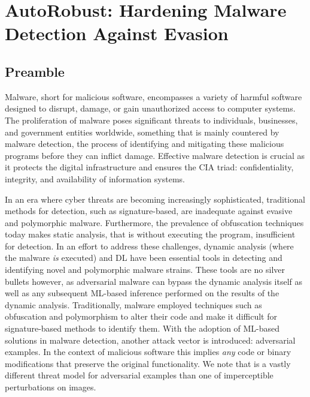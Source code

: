 \chapter{AutoRobust: Hardening Malware Detection Against Evasion}\label{ch:autorobust}
\section*{Preamble}

Malware, short for malicious software, encompasses a variety of harmful software designed to disrupt, damage, or gain unauthorized access to computer systems.
The proliferation of malware poses significant threats to individuals, businesses, and government entities worldwide, something that is mainly countered by malware detection, the process of identifying and mitigating these malicious programs before they can inflict damage.
Effective malware detection is crucial as it protects the digital infrastructure and ensures the CIA triad: confidentiality, integrity, and availability of information systems.

In an era where cyber threats are becoming increasingly sophisticated, traditional methods for detection, such as signature-based, are inadequate against evasive and polymorphic malware.
Furthermore, the prevalence of obfuscation techniques today makes static analysis, that is without executing the program, insufficient for detection.
In an effort to address these challenges, dynamic analysis (where the malware \textit{is} executed) and \gls{DL} have been essential tools in detecting and identifying novel and polymorphic malware strains.
These tools are no silver bullets however, as adversarial malware can bypass the dynamic analysis itself as well as any subsequent ML-based inference performed on the results of the dynamic analysis.
Traditionally, malware employed techniques such as obfuscation and polymorphism to alter their code and make it difficult for signature-based methods to identify them.
With the adoption of ML-based solutions in malware detection,
another attack vector is introduced: adversarial examples.
In the context of malicious software this implies \textit{any} code or binary modifications that preserve the original functionality.
We note that is a vastly different threat model for adversarial examples than one of imperceptible perturbations on images.

